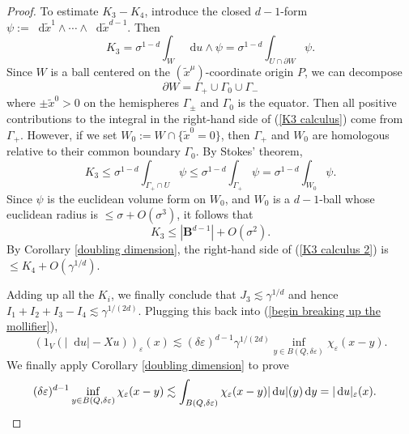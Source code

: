 \documentclass[reqno,11pt]{amsart}
\newcommand{\Ball}{\mathbf{B}}
\newcommand*\dif{\mathop{}\!\mathrm{d}}
\theoremstyle{definition}
\numberwithin{equation}{section}
\begin{document}
\begin{proof}
To estimate $K_3 - K_4$, introduce the closed $d-1$-form $\psi := \dif \tilde x^1 \wedge \cdots \wedge \dif \tilde x^{d - 1}$.
Then
\begin{equation}\label{K3 calculus}
K_3 = \sigma^{1 - d} \int_W \dif u \wedge \psi = \sigma^{1 - d} \int_{U \cap \partial W} \psi.
\end{equation}
Since $W$ is a ball centered on the $(\tilde x^\mu)$-coordinate origin $P$, we can decompose
$$\partial W = \Gamma_+ \cup \Gamma_0 \cup \Gamma_-$$
where $\pm \tilde x^0 > 0$ on the hemispheres $\Gamma_\pm$ and $\Gamma_0$ is the equator.
Then all positive contributions to the integral in the right-hand side of (\ref{K3 calculus}) come from $\Gamma_+$.
However, if we set $W_0 := W \cap \{\tilde x^0 = 0\}$, then $\Gamma_+$ and $W_0$ are homologous relative to their common boundary $\Gamma_0$.
By Stokes' theorem,
$$K_3 \leq \sigma^{1 - d} \int_{\Gamma_+ \cap U} \psi \leq \sigma^{1 - d} \int_{\Gamma_+} \psi = \sigma^{1 - d} \int_{W_0} \psi.$$
Since $\psi$ is the euclidean volume form on $W_0$, and $W_0$ is a $d-1$-ball whose euclidean radius is $\leq \sigma + O(\sigma^3)$, it follows that
\begin{equation}\label{K3 calculus 2}
K_3 \leq |\Ball^{d - 1}| + O(\sigma^2).
\end{equation}
By Corollary \ref{doubling dimension}, the right-hand side of (\ref{K3 calculus 2}) is $\leq K_4 + O(\gamma^{1/d})$.

Adding up all the $K_i$, we finally conclude that $J_3 \lesssim \gamma^{1/d}$ and hence $I_1 + I_2 + I_3 - I_4 \lesssim \gamma^{1/(2d)}$.
Plugging this back into (\ref{begin breaking up the mollifier}),
$$(1_V(|\dif u| - X u))_\varepsilon(x) \lesssim (\delta\varepsilon)^{d - 1} \gamma^{1/(2d)} \inf_{y \in B(Q, \delta\varepsilon)} \chi_\varepsilon(x - y).$$
We finally apply Corollary \ref{doubling dimension} to prove
\begin{align*}
(\delta\varepsilon)^{d - 1} \inf_{y \in B(Q, \delta\varepsilon)} \chi_\varepsilon(x - y)
&\lesssim \int_{B(Q, \delta \varepsilon)} \chi_\varepsilon(x - y) |\dif u|(y) \dif y = |\dif u|_\varepsilon(x). \qedhere
\end{align*}
\end{proof}
\end{document}
